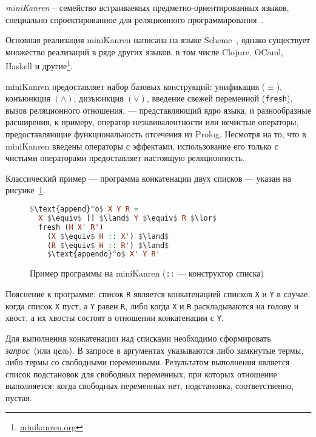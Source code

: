 {\it miniKanren} -- семейство встраиваемых предметно-ориентированных языков,
специально спроектированное для реляционного программирования~\cite{byrdMK}.

Основная реализация miniKanren написана на языке Scheme~\cite{reasonedSchemer},
однако существует множество реализаций в ряде других языков, в том числе
Clojure, OCaml, Haskell и другие\footnote{\url{minikanren.org}}.

miniKanren предоставляет набор базовых конструкций: унификация ($\equiv$),
конъюнкция $(\land)$, дизъюнкция $(\lor)$, введение свежей переменной
(\lstinline{fresh}), вызов реляционного отношения,
--- представляющий ядро языка, и разнообразные расширения, к примеру, оператор неэквивалентности
 или нечистые операторы, предоставляющие функциональность
отсечения из Prolog. Несмотря на то, что в miniKanren введены операторы с эффектами, использование
его только с чистыми операторами предоставляет настоящую реляционность.

Классический пример --- программа конкатенации двух списков --- указан
на рисунке~\ref{fig:appendo}.

\begin{figure}[h!]
\begin{lstlisting}[mathescape,language=Haskell,extendedchars=\true,frame=single,basicstyle=\ttfamily]
$\text{append}^o$ X Y R =
  X $\equiv$ [] $\land$ Y $\equiv$ R $\lor$
  fresh (H X' R')
    (X $\equiv$ H :: X') $\land$
    (R $\equiv$ H :: R') $\land$
    $\text{appendo}^o$ X' Y R'
\end{lstlisting}

\caption{Пример программы на miniKanren (\lstinline{::} --- конструктор списка)}
\label{fig:appendo}
\end{figure}

Пояснение к программе:
список \lstinline{R} является конкатенацией списков \lstinline{X} и
\lstinline{Y} в случае, когда список \lstinline{X} пуст, а \lstinline{Y}
равен \lstinline{R}, либо когда \lstinline{X} и \lstinline{R} раскладываются
на голову и хвост, а их хвосты состоят в отношении конкатенации с \lstinline{Y}.

Для выполнения конкатенации над списками необходимо сформировать
\emph{запрос}~(или \emph{цель}).
В запросе в аргументах указываются либо замкнутые термы, либо термы
со свободными переменными. Результатом выполнения является список
подстановок для свободных переменных, при которых отношение выполняется;
когда свободных переменных нет, подстановка, соответственно, пустая.

